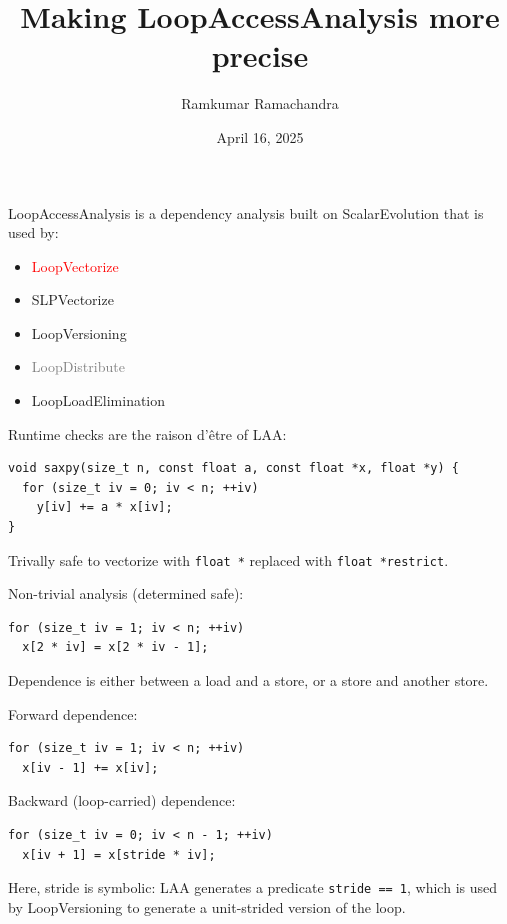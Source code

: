 \documentclass{beamer}
\title{Making LoopAccessAnalysis more precise}
\author{Ramkumar Ramachandra}
\institute{Codasip}
\date{April 16, 2025}
\begin{document}
\begin{frame}
  \titlepage
\end{frame}
\begin{frame}
  LoopAccessAnalysis is a dependency analysis built on ScalarEvolution that is used by:
  \begin{itemize}
    \item \textcolor{red}{LoopVectorize}
    \item SLPVectorize
    \item LoopVersioning
    \item \textcolor{gray}{LoopDistribute}
    \item LoopLoadElimination
  \end{itemize}
\end{frame}

\begin{frame}[containsverbatim]
  Runtime checks are the raison d'être of LAA:
  \begin{verbatim}
void saxpy(size_t n, const float a, const float *x, float *y) {
  for (size_t iv = 0; iv < n; ++iv)
    y[iv] += a * x[iv];
}
  \end{verbatim}

  \vspace{1em}

  Trivally safe to vectorize with \texttt{float *} replaced with \texttt{float *restrict}.

  \vspace{1em}

  Non-trivial analysis (determined safe):
  \begin{verbatim}
for (size_t iv = 1; iv < n; ++iv)
  x[2 * iv] = x[2 * iv - 1];
  \end{verbatim}
\end{frame}

\begin{frame}[containsverbatim]
  Dependence is either between a load and a store, or a store and another store.

  \vspace{1em}

  Forward dependence:
  \begin{verbatim}
for (size_t iv = 1; iv < n; ++iv)
  x[iv - 1] += x[iv];
  \end{verbatim}

  \vspace{1em}

  Backward (loop-carried) dependence:
  \begin{verbatim}
for (size_t iv = 0; iv < n - 1; ++iv)
  x[iv + 1] = x[stride * iv];
  \end{verbatim}

  \vspace{1em}

  Here, stride is symbolic: LAA generates a predicate \texttt{stride == 1}, which is used by LoopVersioning to generate a unit-strided version of the loop.
\end{frame}
\end{document}
